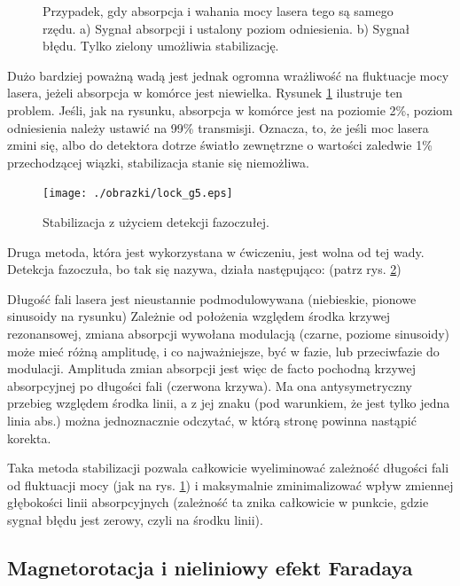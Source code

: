\documentclass[a4paper,10pt]{article}
\begin{document}
\begin{figure}
\caption{Przypadek, gdy absorpcja i wahania mocy lasera tego są samego rzędu. a) Sygnał absorpcji i ustalony poziom odniesienia. b) Sygnał błędu. Tylko zielony umożliwia stabilizację. }
\label{fig:lock2}
\end{figure} 


Dużo bardziej poważną wadą jest jednak ogromna wrażliwość na fluktuacje mocy lasera, jeżeli absorpcja w komórce jest niewielka.
Rysunek \ref{fig:lock2} ilustruje ten problem. Jeśli, jak na rysunku, absorpcja w komórce jest na poziomie 2\%, poziom odniesienia
należy ustawić na 99\% transmisji. Oznacza, to, że jeśli moc lasera zmini się, albo do detektora dotrze światło zewnętrzne o wartości
zaledwie 1\% przechodzącej wiązki, stabilizacja stanie się niemożliwa.

\begin{figure}

\texttt{[image: ./obrazki/lock\_g5.eps]}
\caption{Stabilizacja z użyciem detekcji fazoczułej.}
\label{fig:lock3}
\end{figure} 

Druga metoda, która jest wykorzystana w ćwiczeniu, jest wolna od tej wady.
Detekcja fazoczuła, bo tak się nazywa, działa następująco: (patrz rys. \ref{fig:lock3})

 Długość fali lasera jest nieustannie podmodulowywana (niebieskie, pionowe sinusoidy na rysunku)
  Zależnie od położenia względem środka krzywej rezonansowej, zmiana absorpcji wywołana modulacją (czarne, poziome sinusoidy) może mieć
 różną amplitudę, i co najważniejsze, być w fazie, lub przeciwfazie do modulacji.
  Amplituda zmian absorpcji jest więc de facto pochodną krzywej absorpcyjnej po długości fali (czerwona krzywa). 
  Ma ona antysymetryczny przebieg względem środka linii, a z jej znaku (pod warunkiem, że jest tylko jedna linia abs.)
 można jednoznacznie odczytać, w którą stronę powinna nastąpić korekta.
 
 Taka metoda stabilizacji pozwala całkowicie wyeliminować zależność długości fali od fluktuacji mocy (jak na rys. \ref{fig:lock2})  i maksymalnie zminimalizować wpływ zmiennej głębokości linii absorpcyjnych (zależność ta znika całkowicie w punkcie, gdzie sygnał błędu jest zerowy, czyli na środku linii).
 
\subsection{Magnetorotacja i nieliniowy efekt Faradaya}
\end{document}
